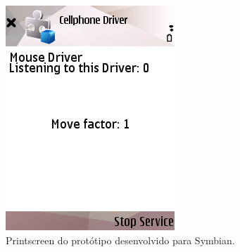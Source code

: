 \begin{figure}[h]
	\centering
	\begin{minipage}[t]{0.30\linewidth}
		\includegraphics[width=\linewidth]{imagens/printscreen_n95}
		\caption{Printscreen do protótipo desenvolvido para Symbian.}
		\label{fig:printscreen_symbian}
	\end{minipage}
	\hfill
	\begin{minipage}[t]{0.30\linewidth}

\end{minipage}
\end{figure}
